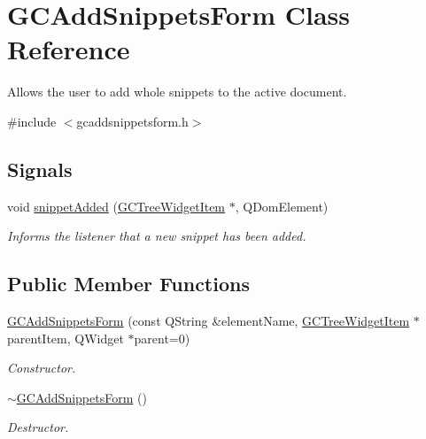 \hypertarget{class_g_c_add_snippets_form}{\section{\-G\-C\-Add\-Snippets\-Form \-Class \-Reference}
\label{class_g_c_add_snippets_form}
}


\-Allows the user to add whole snippets to the active document.  




{\ttfamily \#include $<$gcaddsnippetsform.\-h$>$}

\subsection*{\-Signals}
\begin{DoxyCompactItemize}
\item 
void \hyperlink{class_g_c_add_snippets_form_ae911d230e14e1473223a6f2b087febef}{snippet\-Added} (\hyperlink{class_g_c_tree_widget_item}{\-G\-C\-Tree\-Widget\-Item} $\ast$, \-Q\-Dom\-Element)
\begin{DoxyCompactList}\small\item\em \-Informs the listener that a new snippet has been added. \end{DoxyCompactList}\end{DoxyCompactItemize}
\subsection*{\-Public \-Member \-Functions}
\begin{DoxyCompactItemize}
\item 
\hyperlink{class_g_c_add_snippets_form_af1cfc60ffd8ac6b25f1d1a2dc49e311b}{\-G\-C\-Add\-Snippets\-Form} (const \-Q\-String \&element\-Name, \hyperlink{class_g_c_tree_widget_item}{\-G\-C\-Tree\-Widget\-Item} $\ast$parent\-Item, \-Q\-Widget $\ast$parent=0)
\begin{DoxyCompactList}\small\item\em \-Constructor. \end{DoxyCompactList}\item 
\hyperlink{class_g_c_add_snippets_form_a3a56853da9df0a69b7dfc0de3c762d9e}{$\sim$\-G\-C\-Add\-Snippets\-Form} ()
\begin{DoxyCompactList}\small\item\em \-Destructor. \end{DoxyCompactList}\end{DoxyCompactItemize}


